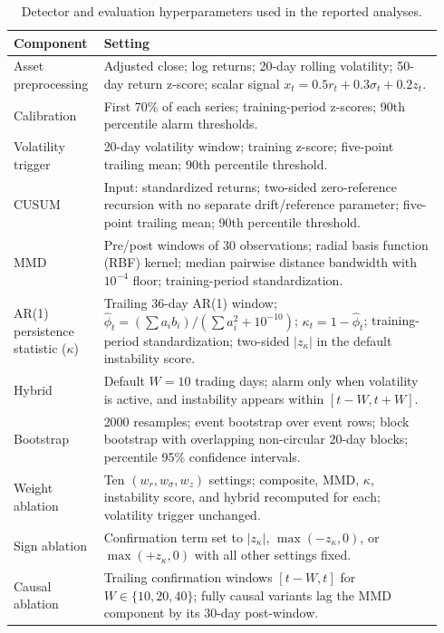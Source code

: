 \documentclass{book}
\begin{document}
\begin{table}[!tbp]
\centering
\caption{Detector and evaluation hyperparameters used in the reported analyses.}
\label{tab:hyperparams}
\scriptsize
\begin{tabular}{p{0.18\linewidth}p{0.76\linewidth}}
\toprule
Component & Setting \\
\midrule
Asset preprocessing & Adjusted close; log returns; 20-day rolling volatility; 50-day return z-score; scalar signal $x_t=0.5r_t+0.3\sigma_t+0.2z_t$.\\
Calibration & First 70\% of each series; training-period z-scores; 90th percentile alarm thresholds.\\
Volatility trigger & 20-day volatility window; training z-score; five-point trailing mean; 90th percentile threshold.\\
CUSUM & Input: standardized returns; two-sided zero-reference recursion with no separate drift/reference parameter; five-point trailing mean; 90th percentile threshold.\\
MMD & Pre/post windows of 30 observations; radial basis function (RBF) kernel; median pairwise distance bandwidth with $10^{-4}$ floor; training-period standardization.\\
AR(1) persistence statistic ($\kappa$) & Trailing 36-day AR(1) window; $\widehat\phi_t=(\sum a_i b_i)/(\sum a_i^2+10^{-10})$; $\kappa_t=1-\widehat\phi_t$; training-period standardization; two-sided $|z_\kappa|$ in the default instability score.\\
Hybrid & Default $W=10$ trading days; alarm only when volatility is active, and instability appears within $[t-W,t+W]$.\\
Bootstrap & 2000 resamples; event bootstrap over event rows; block bootstrap with overlapping non-circular 20-day blocks; percentile 95\% confidence intervals.\\
Weight ablation & Ten $(w_r,w_\sigma,w_z)$ settings; composite, MMD, $\kappa$, instability score, and hybrid recomputed for each; volatility trigger unchanged.\\
Sign ablation & Confirmation term set to $|z_\kappa|$, $\max(-z_\kappa,0)$, or $\max(+z_\kappa,0)$ with all other settings fixed.\\
Causal ablation & Trailing confirmation windows $[t-W,t]$ for $W\in\{10,20,40\}$; fully causal variants lag the MMD component by its 30-day post-window.\\
\bottomrule
\end{tabular}
\end{table}
\end{document}
